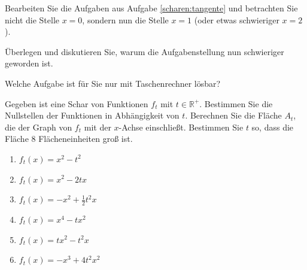 \documentclass[11pt,a4paper,twoside,fleqn]{article}
\begin{document}
\begin{question}[name=$\bigstar$ Aufgabe]
  
Bearbeiten Sie die Aufgaben aus Aufgabe \ref{scharen:tangente} und betrachten
Sie nicht die Stelle $x=0$, sondern nun die Stelle $x=1$ (oder etwas
schwieriger $x=2$).

Überlegen und diskutieren Sie, warum die Aufgabenstellung nun
schwieriger geworden ist. 

Welche Aufgabe ist für Sie nur mit Taschenrechner lösbar? 
\end{question}
\begin{question}
  
  Gegeben ist eine Schar von Funktionen $f_t$ mit
  $t\in\mathbb{R}^+$. Bestimmen Sie die Nullstellen der Funktionen in
  Abhängigkeit von $t$. Berechnen Sie die Fläche $A_t$, die der Graph von
  $f_t$ mit der $x$-Achse einschließt. Bestimmen Sie $t$ so, dass die
  Fläche 8 Flächeneinheiten groß ist.
  \begin{multicols}{3}
      \begin{enumerate}\itemsep0pt
      \item $f_t(x)=x^2-t^2$
      \item $f_t(x)=x^2-2tx$
      \item $f_t(x)=-x^2 + \frac 1 2 t^2x$
      \item $f_t(x)=x^4-tx^2$
      \item $f_t(x)=tx^2-t^2x$
      \item $f_t(x)=-x^3 + 4t^2x^2$
      \end{enumerate}
    \end{multicols}
  \end{question}
\end{document}
